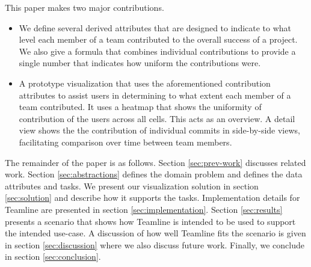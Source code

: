 \documentclass[../manifest.tex]{subfiles}
\begin{document}
This paper makes two major contributions.
\begin{itemize}
  \item We define several derived attributes that are designed to indicate to what level each member of a team contributed to the overall success of a project. We also give a formula that combines individual contributions to provide a single number that indicates how uniform the contributions were.
  \item A prototype visualization that uses the aforementioned contribution attributes to assist users in determining to what extent each member of a team contributed. It uses a heatmap that shows the uniformity of contribution of the users across all cells. This acts as an overview. A detail view shows the the contribution of individual commits in side-by-side views, facilitating comparison over time between team members.
\end{itemize}

The remainder of the paper is as follows. Section \ref{sec:prev-work} discusses related work. Section \ref{sec:abstractions} defines the domain problem and defines the data attributes and tasks. We present our visualization solution in section \ref{sec:solution} and describe how it supports the tasks. Implementation details for Teamline are presented in section \ref{sec:implementation}. Section \ref{sec:results} presents a scenario that shows how Teamline is intended to be used to support the intended use-case. A discussion of how well Teamline fits the scenario is given in section \ref{sec:discussion} where we also discuss future work. Finally, we conclude in section \ref{sec:conclusion}.
\end{document}
